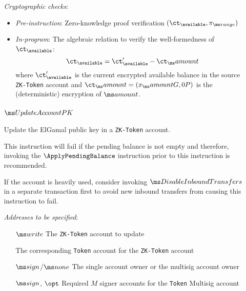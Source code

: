 \noindent
\textit{Cryptographic checks}:
\begin{itemize}
  \item \textit{Pre-instruction}: Zero-knowledge proof verification
    $(\ct_\available, \pirange)$
  \item \textit{In-program}: The algebraic relation to verify the
    well-formedness of $\ct_\available$:
    \[ \ct_\available = \ct'_\available - \ct_\amount \]
    where $\ct'_\available$ is the current encrypted available balance in
    the source \texttt{ZK-Token} account and $\ct_\amount = (x_\amount G, 0P)$
    is the (deterministic) encryption of $\amount$.
\end{itemize}


\clearpage

\subsubsection{$\UpdateAccountPK$}
Update the ElGamal public key in a \texttt{ZK-Token} account.

This instruction will fail if the pending balance is not empty and therefore,
invoking the $\ApplyPendingBalance$ instruction prior to this instruction is
recommended.

If the account is heavily used, consider invoking $\DisableInboundTransfers$ in
a separate transaction first to avoid new inbound transfers from causing this
instruction to fail.
\vspace{0.5em}

\noindent
\textit{Addresses to be specified}:
\begin{itemize}[leftmargin=2.5cm]
  \item[$\writable$] The \texttt{ZK-Token} account to update
  \item[] The corresponding \texttt{Token} account for the \texttt{ZK-Token}
    account
  \item[$\signer$/$\none$] The single account owner or the multisig account
    owner
  \item[$\signer$, $\opt$]  Required $M$ signer accounts for the \texttt{Token} Multisig
    account
\end{itemize}

